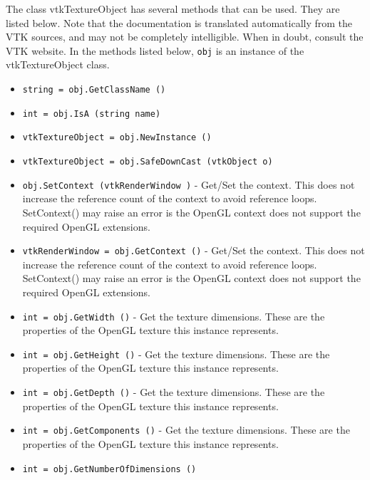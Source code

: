 The class vtkTextureObject has several methods that can be used.
  They are listed below.
Note that the documentation is translated automatically from the VTK sources,
and may not be completely intelligible.  When in doubt, consult the VTK website.
In the methods listed below, \verb|obj| is an instance of the vtkTextureObject class.
\begin{itemize}
\item  \verb|string = obj.GetClassName ()|

\item  \verb|int = obj.IsA (string name)|

\item  \verb|vtkTextureObject = obj.NewInstance ()|

\item  \verb|vtkTextureObject = obj.SafeDownCast (vtkObject o)|

\item  \verb|obj.SetContext (vtkRenderWindow )| -  Get/Set the context. This does not increase the reference count of the 
 context to avoid reference loops.
 SetContext() may raise an error is the OpenGL context does not support the
 required OpenGL extensions.

\item  \verb|vtkRenderWindow = obj.GetContext ()| -  Get/Set the context. This does not increase the reference count of the 
 context to avoid reference loops.
 SetContext() may raise an error is the OpenGL context does not support the
 required OpenGL extensions.

\item  \verb|int = obj.GetWidth ()| -  Get the texture dimensions.
 These are the properties of the OpenGL texture this instance represents.

\item  \verb|int = obj.GetHeight ()| -  Get the texture dimensions.
 These are the properties of the OpenGL texture this instance represents.

\item  \verb|int = obj.GetDepth ()| -  Get the texture dimensions.
 These are the properties of the OpenGL texture this instance represents.

\item  \verb|int = obj.GetComponents ()| -  Get the texture dimensions.
 These are the properties of the OpenGL texture this instance represents.

\item  \verb|int = obj.GetNumberOfDimensions ()|


\end{itemize}
